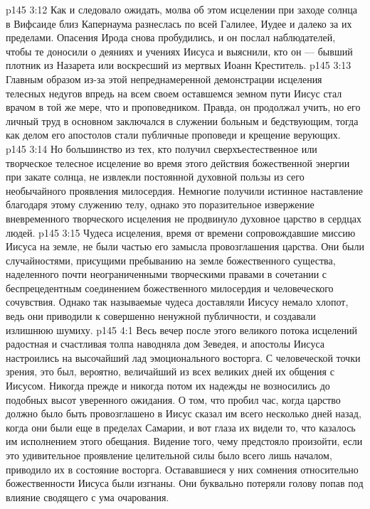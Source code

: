\vs p145 3:12 \pc Как и следовало ожидать, молва об этом исцелении при заходе солнца в Вифсаиде близ Капернаума разнеслась по всей Галилее, Иудее и далеко за их пределами. Опасения Ирода снова пробудились, и он послал наблюдателей, чтобы те доносили о деяниях и учениях Иисуса и выяснили, кто он --- бывший плотник из Назарета или воскресший из мертвых Иоанн Креститель.
\vs p145 3:13 Главным образом из\hyp{}за этой непреднамеренной демонстрации исцеления телесных недугов впредь на всем своем оставшемся земном пути Иисус стал врачом в той же мере, что и проповедником. Правда, он продолжал учить, но его личный труд в основном заключался в служении больным и бедствующим, тогда как делом его апостолов стали публичные проповеди и крещение верующих.
\vs p145 3:14 Но большинство из тех, кто получил сверхъестественное или творческое телесное исцеление во время этого действия божественной энергии при закате солнца, не извлекли постоянной духовной пользы из сего необычайного проявления милосердия. Немногие получили истинное наставление благодаря этому служению телу, однако это поразительное извержение вневременного творческого исцеления не продвинуло духовное царство в сердцах людей.
\vs p145 3:15 Чудеса исцеления, время от времени сопровождавшие миссию Иисуса на земле, не были частью его замысла провозглашения царства. Они были случайностями, присущими пребыванию на земле божественного существа, наделенного почти неограниченными творческими правами в сочетании с беспрецедентным соединением божественного милосердия и человеческого сочувствия. Однако так называемые чудеса доставляли Иисусу немало хлопот, ведь они приводили к совершенно ненужной публичности, и создавали излишнюю шумиху.
\vs p145 4:1 Весь вечер после этого великого потока исцелений радостная и счастливая толпа наводняла дом Зеведея, и апостолы Иисуса настроились на высочайший лад эмоционального восторга. С человеческой точки зрения, это был, вероятно, величайший из всех великих дней их общения с Иисусом. Никогда прежде и никогда потом их надежды не возносились до подобных высот уверенного ожидания. О том, что пробил час, когда царство должно было быть провозглашено в  Иисус сказал им всего несколько дней назад, когда они были еще в пределах Самарии, и вот глаза их видели то, что казалось им исполнением этого обещания. Видение того, чему предстояло произойти, если это удивительное проявление целительной силы было всего лишь началом, приводило их в состояние восторга. Остававшиеся у них сомнения относительно божественности Иисуса были изгнаны. Они буквально потеряли голову попав под влияние сводящего с ума очарования.
